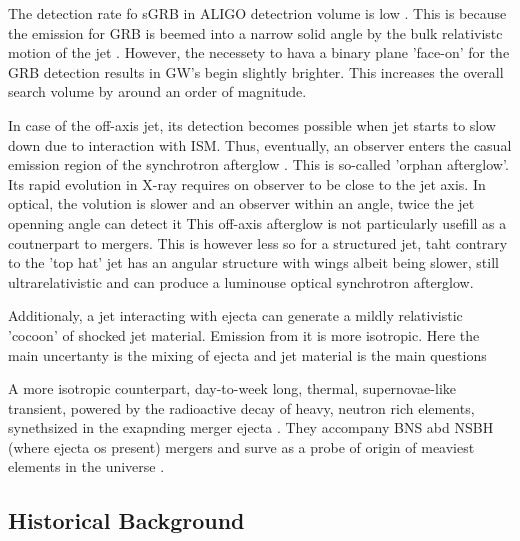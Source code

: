 \documentclass[11pt,a4paper,headinclude=true,DIV=14,BCOR=8mm,chapterprefix,listof=totoc,twoside,openright,abstracton]{scrbook}
\begin{document}
The detection rate fo sGRB in ALIGO detectrion volume is low \cite{(Metzger and Berger 2012)}. This is because the emission for GRB is beemed into a narrow solid angle by the bulk relativistc motion of the jet \cite{Fong et al 2015; Troja et al 2016)}. However, the necessety to hava a binary plane 'face-on' for the GRB detection results in GW's begin slightly brighter. This increases the overall search volume by around an order of magnitude.

In case of the off-axis jet, its detection becomes possible when jet starts to slow down due to interaction with ISM. Thus, eventually, an observer enters the casual emission region of the synchrotron afterglow \cite{(Totani and Panaitescu 2002)}.
This is so-called 'orphan afterglow'.
Its rapid evolution in X-ray requires on observer to be close to the jet axis. In optical, the volution is slower and an observer within an angle, twice the jet openning angle can detect it \cite{(Metzger and Berger 2012, their Figs. 3 } This off-axis afterglow is not particularly usefill as a coutnerpart to mergers. This is however less so for a structured jet, taht contrary to the 'top hat' jet has an angular structure with wings albeit being slower, still ultrarelativistic and can produce a luminouse optical synchrotron afterglow. \cite{(Perna et al 2003; Lamb and Kobayashi 2016)}

Additionaly, a jet interacting with ejecta can generate a mildly relativistic 'cocoon' of shocked jet material. Emission from it is more isotropic. Here the main uncertanty is the mixing of ejecta and jet material is the main questions \cite{(Lazzati et al 2016; Nakar and Piran 2017)}

A more isotropic counterpart, day-to-week long, thermal, supernovae-like transient, powered by the radioactive decay of heavy, neutron rich elements, synethsized in the exapnding merger ejecta \cite{(Li and Paczyinski 1998)}. They accompany BNS abd NSBH (where ejecta os present) mergers and surve as a probe of origin of meaviest elements in the universe \cite{(Metzger et al 2010b)}.


\subsection{Historical Background}
\end{document}

